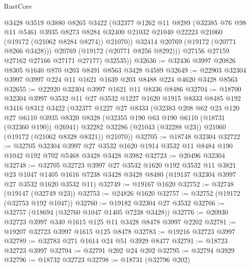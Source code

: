 \begin{lexlean}{RustCore}
\begin{coremodule}
              @3428
              @3519
              @3880
              @8265
              @3422
              (@32377
                @1262
                @11
                @8289
                (@32385
                  @76
                  @98
                  @11
                  @5461
                  @3935
                  @8273
                  @8284
                  @32400
                  @21032
                  @21040
                  @22223
                  @21060
                  (@19172 (@21062 @8284 @8274))
                  @21070))
              @32414
              @20769
              (@19172 (@20771 @8266 @3428)))
            @20769
            (@19172 (@20771 @8256 @8292)))
          @27156
          @27159
          @27162
          @27166
          @27171
          @27177)
        @32535))
@32636 := @32436 @3997 @20826 @8305 @1640 @870 @203 @8491 @8563 @3428 @4589
@32649 := @22903 @32304 @3997 @3997 @224 @11 @1621 @1639 @203 @8488 @224 @4620 @3428 @8563
@32655 := @22920 @32304 @3997 @1621 @11 @8336 @8486
@32704 := @18700
    @32304
    @3997
    @3532
    @11
    @27
    @3532
    @1227
    @1620
    @1915
    @8333
    @8485
    @192
    @3416
    @8312
    @3422
    (@32377
      @1227
      @27
      @8333
      (@32383
        @208
        @62
        @23
        @120
        @27
        @6110
        @3935
        @8320
        @8328
        (@32355 @190 @63 @190 @6110 (@18731 (@32360 @190)) @26941)
        @32282
        @32286
        (@21043 (@32288 @23))
        @21060
        (@19172 (@21062 @8328 @8321))
        @21070))
@32705 := @18748 @32304
@32722 := @32705
    @32304
    @3997
    @27
    @3532
    @1620
    @1914
    @3532
    @11
    @8484
    @190
    @1042
    @192
    @702
    @5468
    @3428
    @3428
    @3982
@32723 := @20496 @32304
@32748 := @32705
    @32723
    @3997
    @27
    @3532
    @1620
    @192
    @3532
    @11
    @3821
    @23
    @1047
    @1405
    @1616
    @7238
    @3428
    @3428
    @8480
    (@19137 @32304 @3997 @27 @3532 @1620 @3532 @11)
@32749 := @19167 @1620
@32752 := @32748 (@19147 (@32749 @23))
@32753 := @24826 @1620
@32757 := @32752 (@19172 (@32753 @192 @1047))
@32760 := @19182 @32304 @27 @3532
@32766 := @32757 (@18694 (@32760 @1047 @1405 @7238 @3428))
@32776 := @20930 @32723 @3997 @340 @1615 @125 @11 @3428 @8478 @3997 @2202
@32781 := @19207 @32723 @3997 @1615 @125 @8478
@32783 := @19216 @32723 @3997
@32789 := @32783 @271 @1614 @24 @51 @3929 @8477
@32791 := @18723 @32723 @3997
@32794 := @32791 @202 @24 @202
@32795 := @32794 @3929
@32796 := @18732 @32723
@32798 := @18731 (@32796 @202)

\end{coremodule}
\end{lexlean}
